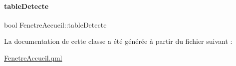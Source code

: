 \mbox{\label{class_fenetre_accueil_af1414772143899204bf91d030fcc54eb}} 
\paragraph{\texorpdfstring{table\+Detecte}{tableDetecte}}
{\footnotesize\ttfamily bool Fenetre\+Accueil\+::table\+Detecte}



La documentation de cette classe a été générée à partir du fichier suivant \+:\begin{DoxyCompactItemize}
\item 
\hyperlink{_fenetre_accueil_8qml}{Fenetre\+Accueil.\+qml}\end{DoxyCompactItemize}

